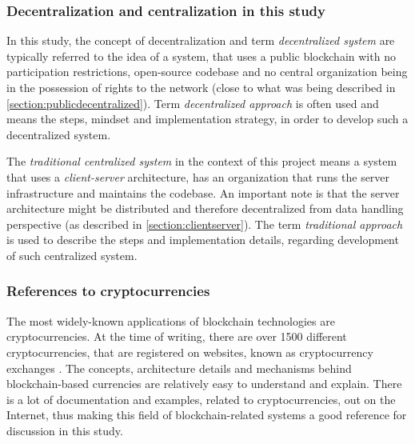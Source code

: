 \subsubsection{Decentralization and centralization in this study}
In this study, the concept of decentralization and term \emph{decentralized system} are typically referred to the idea of a system, that uses a public blockchain with no participation restrictions, open-source codebase and no central organization being in the possession of rights to the network (close to what was being described in \ref{section:publicdecentralized}). Term \emph{decentralized approach} is often used and means the steps, mindset and implementation strategy, in order to develop such a decentralized system.

The \emph{traditional centralized system} in the context of this project means a system that uses a \emph{\gls{client-server}} architecture, has an organization that runs the server infrastructure and maintains the codebase. An important note is that the server architecture might be distributed and therefore decentralized from data handling perspective (as described in \ref{section:clientserver}). The term \emph{traditional approach} is used to describe the steps and implementation details, regarding development of such centralized system. 

\subsubsection{References to cryptocurrencies}
The most widely-known applications of blockchain technologies are cryptocurrencies. At the time of writing, there are over 1500 different cryptocurrencies, that are registered on websites, known as cryptocurrency exchanges \citep{coinmarketcap}. The concepts, architecture details and mechanisms behind blockchain-based currencies are relatively easy to understand and explain. There is a lot of documentation and examples, related to cryptocurrencies, out on the Internet, thus making this field of blockchain-related systems a good reference for discussion in this study. 

